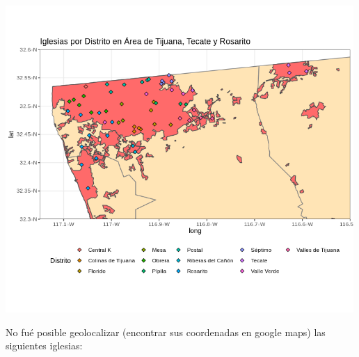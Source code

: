 \documentclass[]{article}
\begin{document}
\includegraphics[width=5.20833in]{img/iglesiasTijuana.png}

No fué posible geolocalizar (encontrar sus coordenadas en google maps)
las siguientes iglesias:
\end{document}
